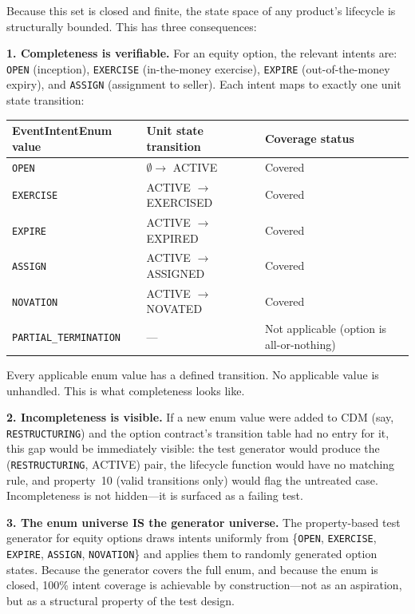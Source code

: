 \documentclass[11pt,a4paper]{article}
\begin{document}
Because this set is closed and finite, the state space of any product's lifecycle is structurally bounded. This has three consequences:

\noindent\textbf{1. Completeness is verifiable.} For an equity option, the relevant intents are: \texttt{OPEN} (inception), \texttt{EXERCISE} (in-the-money exercise), \texttt{EXPIRE} (out-of-the-money expiry), and \texttt{ASSIGN} (assignment to seller). Each intent maps to exactly one unit state transition:

\begin{center}
\begin{tabular}{l l l}
\toprule
\textbf{EventIntentEnum value} & \textbf{Unit state transition} & \textbf{Coverage status} \\
\midrule
\texttt{OPEN} & $\emptyset \to$ ACTIVE & Covered \\
\texttt{EXERCISE} & ACTIVE $\to$ EXERCISED & Covered \\
\texttt{EXPIRE} & ACTIVE $\to$ EXPIRED & Covered \\
\texttt{ASSIGN} & ACTIVE $\to$ ASSIGNED & Covered \\
\texttt{NOVATION} & ACTIVE $\to$ NOVATED & Covered \\
\texttt{PARTIAL\_TERMINATION} & --- & Not applicable (option is all-or-nothing) \\
\bottomrule
\end{tabular}
\end{center}

\noindent Every applicable enum value has a defined transition. No applicable value is unhandled. This is what completeness looks like.

\noindent\textbf{2. Incompleteness is visible.} If a new enum value were added to CDM (say, \texttt{RESTRUCTURING}) and the option contract's transition table had no entry for it, this gap would be immediately visible: the test generator would produce the (\texttt{RESTRUCTURING}, ACTIVE) pair, the lifecycle function would have no matching rule, and property~10 (valid transitions only) would flag the untreated case. Incompleteness is not hidden---it is surfaced as a failing test.

\noindent\textbf{3. The enum universe IS the generator universe.} The property-based test generator for equity options draws intents uniformly from \{\texttt{OPEN}, \texttt{EXERCISE}, \texttt{EXPIRE}, \texttt{ASSIGN}, \texttt{NOVATION}\} and applies them to randomly generated option states. Because the generator covers the full enum, and because the enum is closed, 100\% intent coverage is achievable by construction---not as an aspiration, but as a structural property of the test design.
\end{document}
